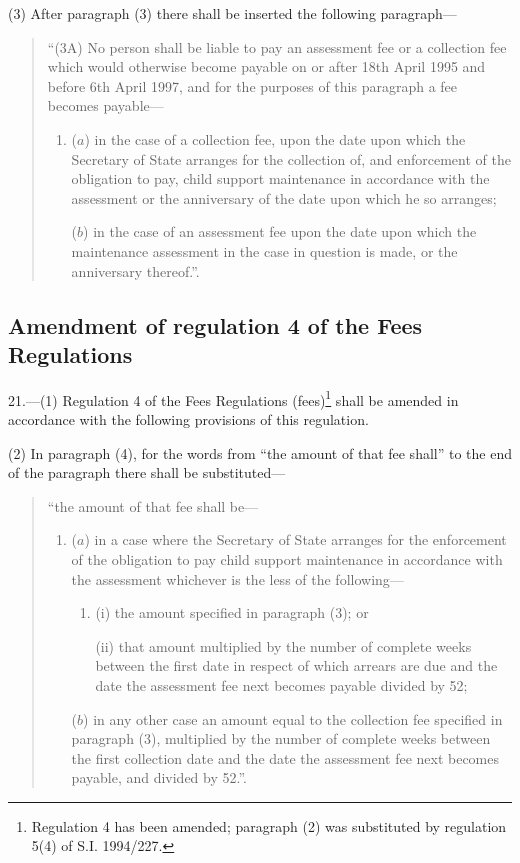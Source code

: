 \documentclass[a4paper]{article}
\begin{document}
(3) After paragraph (3) there shall be inserted the following paragraph—
\begin{quotation}
“(3A) No person shall be liable to pay an assessment fee or a collection fee which would otherwise become payable on or after 18th April 1995 and before 6th April 1997, and for the purposes of this paragraph a fee becomes payable—
\begin{enumerate}\item[]
($a$) in the case of a collection fee, upon the date upon which the Secretary of State arranges for the collection of, and enforcement of the obligation to pay, child support maintenance in accordance with the assessment or the anniversary of the date upon which he so arranges;

($b$) in the case of an assessment fee upon the date upon which the maintenance assessment in the case in question is made, or the anniversary thereof.”.
\end{enumerate}
\end{quotation}

\subsection[21. Amendment of regulation 4 of the Fees Regulations]{Amendment of regulation 4 of the Fees Regulations}

21.—(1) Regulation 4 of the Fees Regulations (fees)\footnote{\frenchspacing Regulation 4 has been amended; paragraph (2) was substituted by regulation 5(4) of S.I. 1994/227.} shall be amended in accordance with the following provisions of this regulation.

(2) In paragraph (4), for the words from “the amount of that fee shall” to the end of the paragraph there shall be substituted—
\begin{quotation}
“the amount of that fee shall be—
\begin{enumerate}\item[]
($a$) in a case where the Secretary of State arranges for the enforcement of the obligation to pay child support maintenance in accordance with the assessment whichever is the less of the following—
\begin{enumerate}\item[]
(i) the amount specified in paragraph (3); or

(ii) that amount multiplied by the number of complete weeks between the first date in respect of which arrears are due and the date the assessment fee next becomes payable divided by 52;
\end{enumerate}

($b$) in any other case an amount equal to the collection fee specified in paragraph (3), multiplied by the number of complete weeks between the first collection date and the date the assessment fee next becomes payable, and divided by 52.”.
\end{enumerate}
\end{quotation}
\end{document}
